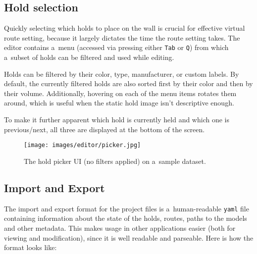 \subsection{Hold selection}
Quickly selecting which holds to place on the wall is crucial for effective virtual route setting, because it largely dictates the time the route setting takes.
The editor contains a~menu (accessed via pressing either \verb|Tab| or \verb|Q|) from which a~subset of holds can be filtered and used while editing.

Holds can be filtered by their color, type, manufacturer, or custom labels.
By default, the currently filtered holds are also sorted first by their color and then by their volume.
Additionally, hovering on each of the menu items rotates them around, which is useful when the static hold image isn't descriptive enough.

To make it further apparent which hold is currently held and which one is previous/next, all three are displayed at the bottom of the screen.

\begin{figure}[h]
	\centering
	\texttt{[image: images/editor/picker.jpg]}%
	\caption{The hold picker UI (no filters applied) on a~sample dataset.}%
	\label{fig:picker}
\end{figure}

\subsection{Import and Export}
The import and export format for the project files is a~human-readable \verb|yaml| file containing information about the state of the holds, routes, paths to the models and other metadata.
This makes usage in other applications easier (both for viewing and modification), since it is well readable and parseable.
Here is how the format looks like:

\newpage

